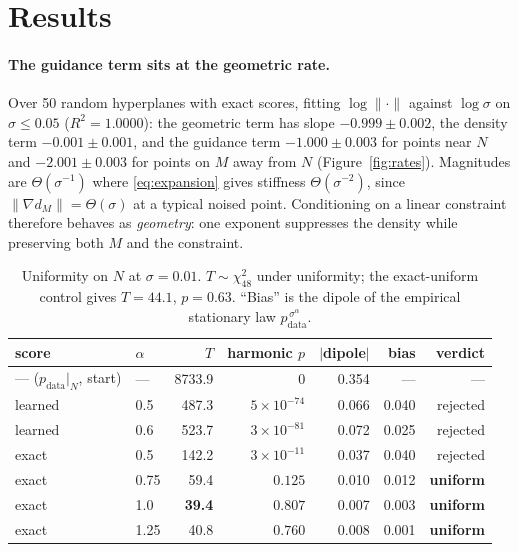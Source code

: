 \documentclass[10pt]{article}
\theoremstyle{definition}
\theoremstyle{plain}
\newcommand{\pdata}{p_{\mathrm{data}}}
\newcommand{\dM}{d_M}
\begin{document}
\section{Results}

\paragraph{The guidance term sits at the geometric rate.}
Over 50 random hyperplanes with exact scores, fitting
$\log\|\cdot\|$ against $\log\sigma$ on $\sigma \le 0.05$ ($R^2 = 1.0000$): the
geometric term has slope $-0.999 \pm 0.002$, the density term
$-0.001 \pm 0.001$, and the guidance term $\mathbf{-1.000 \pm 0.003}$ for points
near $N$ and $\mathbf{-2.001 \pm 0.003}$ for points on $M$ away from $N$
(Figure~\ref{fig:rates}). Magnitudes are $\Theta(\sigma^{-1})$ where
\eqref{eq:expansion} gives stiffness $\Theta(\sigma^{-2})$, since
$\|\nabla \dM\| = \Theta(\sigma)$ at a typical noised point. Conditioning on a
linear constraint therefore behaves as \emph{geometry}: one exponent suppresses
the density while preserving both $M$ and the constraint.

\begin{table}[h]
\centering\small
\caption{Uniformity on $N$ at $\sigma = 0.01$. $T \sim \chi^2_{48}$ under
uniformity; the exact-uniform control gives $T = 44.1$, $p = 0.63$. ``Bias'' is
the dipole of the empirical stationary law $\pdata^{\,\sigma^\alpha}$.}
\label{tab:main}
\begin{tabular}{llrrrrr}
\toprule
score & $\alpha$ & $T$ & harmonic $p$ & $|$dipole$|$ & bias & verdict \\
\midrule
--- ($\pdata|_N$, start) & --- & 8733.9 & $0$ & 0.354 & --- & --- \\
learned & 0.5 & 487.3 & $5{\times}10^{-74}$ & 0.066 & 0.040 & rejected \\
learned & 0.6 & 523.7 & $3{\times}10^{-81}$ & 0.072 & 0.025 & rejected \\
exact & 0.5 & 142.2 & $3{\times}10^{-11}$ & 0.037 & 0.040 & rejected \\
exact & 0.75 & 59.4 & $0.125$ & 0.010 & 0.012 & \textbf{uniform} \\
exact & 1.0 & \textbf{39.4} & $\mathbf{0.807}$ & 0.007 & 0.003 & \textbf{uniform} \\
exact & 1.25 & 40.8 & $0.760$ & 0.008 & 0.001 & \textbf{uniform} \\
\bottomrule
\end{tabular}
\end{table}
\end{document}
